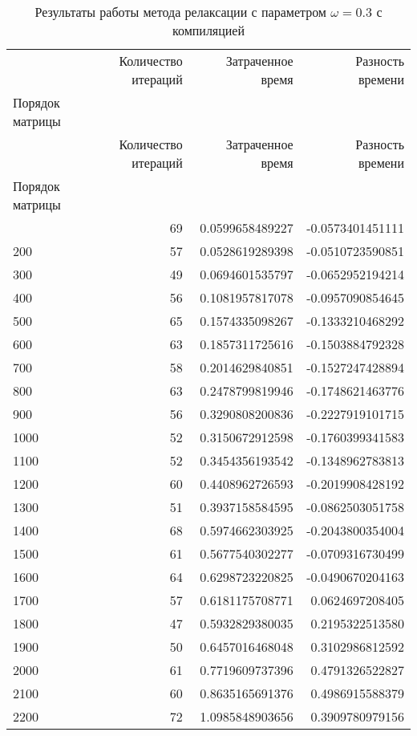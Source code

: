 \begin{longtable}{lrrr}
\caption{Результаты работы метода релаксации с параметром $\omega=0.3$ с компиляцией}\\
\toprule
 & Количество итераций & Затраченное время & Разность времени \\
Порядок матрицы &  &  &  \\
\midrule
\endfirsthead
\toprule
 & Количество итераций & Затраченное время & Разность времени \\
Порядок матрицы &  &  &  \\
\midrule
\endhead
\midrule
\midrule
\endfoot
\bottomrule
\endlastfoot
100 & 69 & 0.0599658489227 & -0.0573401451111 \\
200 & 57 & 0.0528619289398 & -0.0510723590851 \\
300 & 49 & 0.0694601535797 & -0.0652952194214 \\
400 & 56 & 0.1081957817078 & -0.0957090854645 \\
500 & 65 & 0.1574335098267 & -0.1333210468292 \\
600 & 63 & 0.1857311725616 & -0.1503884792328 \\
700 & 58 & 0.2014629840851 & -0.1527247428894 \\
800 & 63 & 0.2478799819946 & -0.1748621463776 \\
900 & 56 & 0.3290808200836 & -0.2227919101715 \\
1000 & 52 & 0.3150672912598 & -0.1760399341583 \\
1100 & 52 & 0.3454356193542 & -0.1348962783813 \\
1200 & 60 & 0.4408962726593 & -0.2019908428192 \\
1300 & 51 & 0.3937158584595 & -0.0862503051758 \\
1400 & 68 & 0.5974662303925 & -0.2043800354004 \\
1500 & 61 & 0.5677540302277 & -0.0709316730499 \\
1600 & 64 & 0.6298723220825 & -0.0490670204163 \\
1700 & 57 & 0.6181175708771 & 0.0624697208405 \\
1800 & 47 & 0.5932829380035 & 0.2195322513580 \\
1900 & 50 & 0.6457016468048 & 0.3102986812592 \\
2000 & 61 & 0.7719609737396 & 0.4791326522827 \\
2100 & 60 & 0.8635165691376 & 0.4986915588379 \\
2200 & 72 & 1.0985848903656 & 0.3909780979156 \\

\end{longtable}
